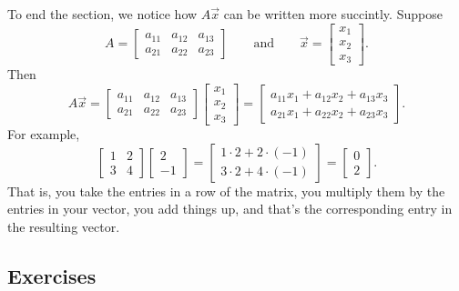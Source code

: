 To end the section, we notice how $A \vec{x}$ can be written more succintly.
Suppose
\begin{equation*}
A = 
\begin{bmatrix}
a_{11} & a_{12} & a_{13} \\
a_{21} & a_{22} & a_{23}
\end{bmatrix}
\qquad \text{and} \qquad
\vec{x} = 
\begin{bmatrix}
x_1 \\ x_2 \\ x_3 
\end{bmatrix} .
\end{equation*}
Then
\begin{equation*}
A \vec{x} = 
\begin{bmatrix}
a_{11} & a_{12} & a_{13} \\
a_{21} & a_{22} & a_{23}
\end{bmatrix}
\begin{bmatrix}
x_1 \\ x_2 \\ x_3 
\end{bmatrix} 
=
\begin{bmatrix}
a_{11} x_1 + a_{12} x_2 + a_{13} x_3 \\
a_{21} x_1 + a_{22} x_2 + a_{23} x_3
\end{bmatrix}  .
\end{equation*}
For example,
\begin{equation*}
\begin{bmatrix}
1 & 2 \\ 3 & 4
\end{bmatrix}
\begin{bmatrix}
2 \\ -1
\end{bmatrix} 
=
\begin{bmatrix}
1 \cdot 2 + 2 \cdot (-1) \\
3 \cdot 2 + 4 \cdot (-1)
\end{bmatrix}
=
\begin{bmatrix}
0 \\ 2
\end{bmatrix}  .
\end{equation*}
That is, you take the entries in a row of the matrix, you multiply them by the
entries in your vector, you add things up, and that's the corresponding
entry in the resulting vector.


\subsection{Exercises}

